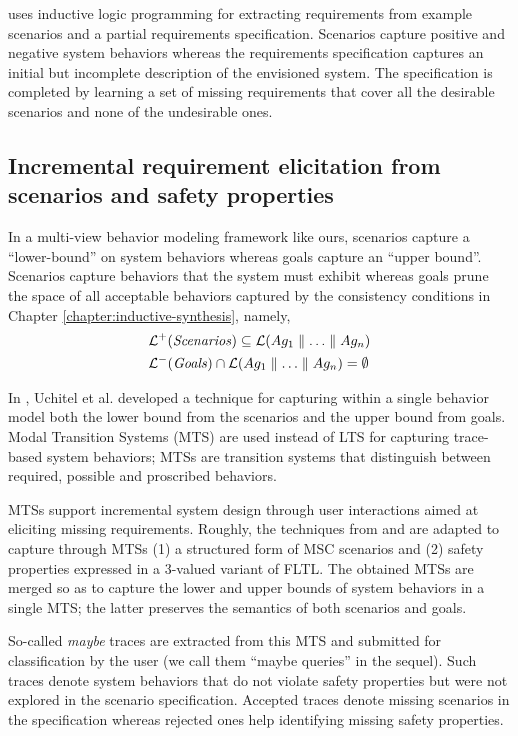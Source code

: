 \cite{Alrajeh:2007} uses inductive logic programming for extracting requirements from example scenarios and a partial requirements specification. Scenarios capture positive and negative system behaviors whereas the requirements specification captures an initial but incomplete description of the envisioned system. The specification is completed by learning a set of missing requirements that cover all the desirable scenarios and none of the undesirable ones.

\subsection{Incremental requirement elicitation from scenarios and safety properties\label{related-for-requirements-2}}

In a multi-view behavior modeling framework like ours, scenarios capture a ``lower-bound'' on system behaviors whereas goals capture an ``upper bound''. Scenarios capture behaviors that the system must exhibit whereas goals prune the space of all acceptable behaviors captured by the consistency conditions in Chapter \ref{chapter:inductive-synthesis}, namely,
\begin{align*}
&\mathcal{L}^+(\mbox{\emph{Scenarios}}) \subseteq \mathcal{L}(Ag_1 \parallel \ldots \parallel Ag_n) \\
&\mathcal{L}^-(\mbox{\emph{Goals}}) \cap \mathcal{L}(Ag_1 \parallel \ldots \parallel Ag_n) = \emptyset
\end{align*}

In \cite{Uchitel:2007, Uchitel:2009}, Uchitel et al. developed a technique for capturing within a single behavior model both the lower bound from the scenarios and the upper bound from goals. Modal Transition Systems (MTS) \cite{Larsen:1988} are used instead of LTS for capturing trace-based system behaviors; MTSs are transition systems that distinguish between required, possible and proscribed behaviors.

MTSs support incremental system design through user interactions aimed at eliciting missing requirements. Roughly, the techniques from \cite{Uchitel:2003} and \cite{Giannakopoulou:2003} are adapted to capture through MTSs (1) a structured form of MSC scenarios and (2) safety properties expressed in a 3-valued variant of FLTL. The obtained MTSs are merged so as to capture the lower and upper bounds of system behaviors in a single MTS; the latter preserves the semantics of both scenarios and goals. 

So-called \emph{maybe} traces are extracted from this MTS and submitted for classification by the user (we call them ``maybe queries'' in the sequel). Such traces denote system behaviors that do not violate safety properties but were not explored in the scenario specification. Accepted traces denote missing scenarios in the specification whereas rejected ones help identifying missing safety properties. 

